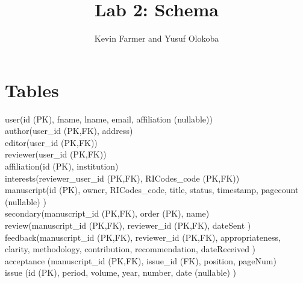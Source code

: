 \documentclass{article}
\title{Lab 2: Schema}
\author{Kevin Farmer and Yusuf Olokoba}
\begin{document}
\maketitle



\section*{Tables}

\medskip
user(id (PK), fname, lname, email, affiliation (nullable)) \\

author(user\_id (PK,FK), address) \\

editor(user\_id (PK,FK)) \\

reviewer(user\_id (PK,FK)) \\

affiliation(id (PK), institution) \\

interests(reviewer\_user\_id (PK,FK), RICodes\_code (PK,FK)) \\

manuscript(id (PK), owner, RICodes\_code, title, status, timestamp, pagecount (nullable) ) \\

secondary(manuscript\_id (PK,FK), order (PK), name) \\

review(manuscript\_id (PK,FK), reviewer\_id (PK,FK), dateSent ) \\

feedback(manuscript\_id (PK,FK), reviewer\_id (PK,FK), appropriateness, clarity, methodology, contribution, recommendation, dateReceived ) \\

acceptance (manuscript\_id (PK,FK), issue\_id (FK), position, pageNum) \\

issue (id (PK), period, volume, year, number, date (nullable) ) \\
\end{document}
